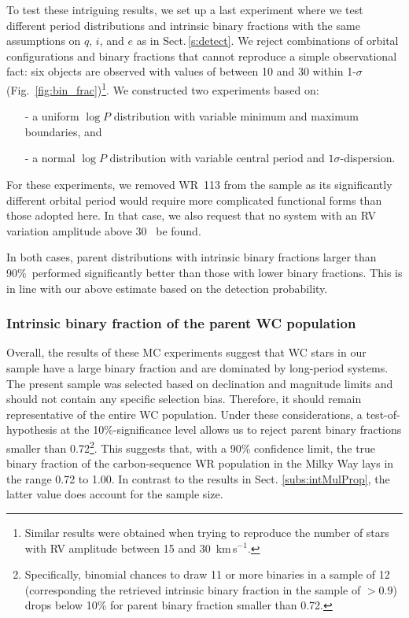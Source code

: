 To test these intriguing results, we set up a last experiment where we test different period distributions and intrinsic binary fractions with the same assumptions on $q$, $i$, and $e$ as in Sect.\,\ref{s:detect}. We reject combinations of orbital configurations and binary fractions that cannot reproduce a simple observational fact: six objects are observed with values of \DelRV{} between 10 and 30 \kms{} within 1-$\sigma$ (Fig.~\ref{fig:bin_frac})\footnote{Similar results were obtained when trying to reproduce the number of stars with RV amplitude between 15 and 30~km\,s$^{-1}$.}. We constructed two experiments based on:
\begin{enumerate}
    \item[-] a uniform $\log P$ distribution with variable minimum and maximum boundaries, and
    \item[-] a normal $\log P$ distribution with variable central period and $1\sigma$-dispersion.
\end{enumerate}
For these experiments, we removed WR~113 from the sample as its significantly different orbital period would require more complicated functional forms than those adopted here. In that case, we also request that no system with an RV variation amplitude above 30~\kms{} be found.

In both cases, parent distributions with intrinsic binary fractions larger than 90\%\ performed significantly better than those with lower binary fractions. This is in line with our above estimate based on the detection probability.

\subsubsection{Intrinsic binary fraction of the parent WC population}
Overall, the results of these MC experiments suggest that WC stars in our sample have a large binary fraction and are dominated by long-period systems. The present sample was selected based on declination and magnitude limits and should not contain any specific selection bias. Therefore, it should remain representative of the entire WC population. Under these considerations, a test-of-hypothesis at the 10\%-significance level allows us to reject parent binary fractions smaller than 0.72\footnote{Specifically, binomial chances to draw 11 or more binaries in a sample of 12 (corresponding the retrieved intrinsic binary fraction in the sample of $>0.9$) drops below 10\% for parent binary fraction smaller than 0.72.}. This suggests that, with a 90\% confidence limit, the true binary fraction of the carbon-sequence WR population in the Milky Way lays in the range 0.72 to 1.00. In contrast to the results in Sect. \ref{subs:intMulProp}, the latter value does account for the sample size.
